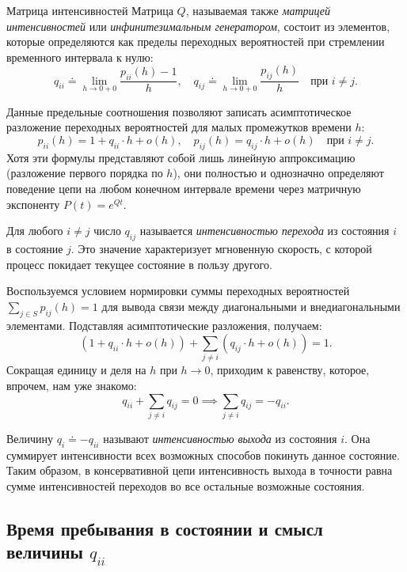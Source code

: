 \begin{definition}{Матрица интенсивностей}
    Матрица $Q$, называемая также \textit{матрицей интенсивностей} или \textit{инфинитезимальным генератором}, состоит из элементов, которые определяются как пределы переходных вероятностей при стремлении временного интервала к нулю:
    \[
        q_{ii} \doteq \lim_{h \to 0+0} \dfrac{p_{ii}(h) - 1}{h}, \quad q_{ij} \doteq \lim_{h \to 0+0} \dfrac{p_{ij}(h)}{h} \quad \text{при } i \neq j.
    \]
\end{definition}

Данные предельные соотношения позволяют записать асимптотическое разложение переходных вероятностей для малых промежутков времени $h$:
\[
    p_{ii}(h) = 1 + q_{ii} \cdot h + o(h), \quad p_{ij}(h) = q_{ij} \cdot h + o(h) \quad \text{при } i \neq j.
\]
Хотя эти формулы представляют собой лишь линейную аппроксимацию (разложение первого порядка по $h$), они полностью и однозначно определяют поведение цепи на любом конечном интервале времени через матричную экспоненту $P(t) = e^{Qt}$.

\begin{statement}
    Для любого $i \neq j$ число $q_{ij}$ называется \textit{интенсивностью перехода} из состояния $i$ в состояние $j$. Это значение характеризует мгновенную скорость, с которой процесс покидает текущее состояние в пользу другого.
\end{statement}

Воспользуемся условием нормировки суммы переходных вероятностей $\sum_{j \in S} p_{ij}(h) = 1$ для вывода связи между диагональными и внедиагональными элементами. Подставляя асимптотические разложения, получаем:
\[
    (1 + q_{ii} \cdot h + o(h)) + \sum_{j \neq i} (q_{ij} \cdot h + o(h)) = 1.
\]
Сокращая единицу и деля на $h$ при $h \to 0$, приходим к равенству, которое, впрочем, нам уже знакомо:
\[
    q_{ii} + \sum_{j \neq i} q_{ij} = 0 \implies \sum_{j \neq i} q_{ij} = -q_{ii}.
\]

\begin{note}
    Величину $q_i \doteq -q_{ii}$ называют \textit{интенсивностью выхода} из состояния $i$. Она суммирует интенсивности всех возможных способов покинуть данное состояние. Таким образом, в консервативной цепи интенсивность выхода в точности равна сумме интенсивностей переходов во все остальные возможные состояния.
\end{note}

\subsection{Время пребывания в состоянии и смысл величины \texorpdfstring{$q_{ii}$}{q\_ii}}

